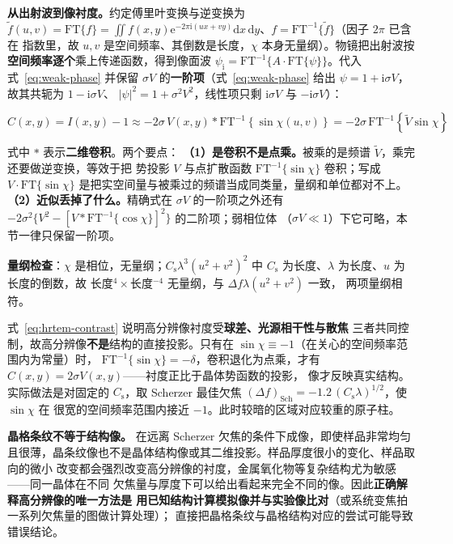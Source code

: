 \textbf{从出射波到像衬度。}约定傅里叶变换与逆变换为
$\tilde{f}(u,v)=\mathrm{FT}\{f\}=\iint f(x,y)\mathrm{e}^{-2\pi\mathrm{i}(ux+vy)}
\mathrm{d}x\,\mathrm{d}y$、$f=\mathrm{FT}^{-1}\{\tilde{f}\}$（因子 $2\pi$ 已含在
指数里，故 $u,v$ 是空间频率、其倒数是长度，$\chi$ 本身无量纲）。物镜把出射波按
\textbf{空间频率逐个}乘上传递函数，得到像面波
$\psi_{\mathrm{i}}=\mathrm{FT}^{-1}\{A\cdot\mathrm{FT}\{\psi\}\}$。代入
式~\eqref{eq:weak-phase} 并保留 $\sigma V$ 的\textbf{一阶项}（式~\eqref{eq:weak-phase}
给出 $\psi=1+\mathrm{i}\sigma V$，故其共轭为 $1-\mathrm{i}\sigma V$、
$|\psi|^{2}=1+\sigma^{2}V^{2}$，线性项只剩 $\mathrm{i}\sigma V$ 与 $-\mathrm{i}\sigma V$）：

\begin{equation}\label{eq:hrtem-contrast}
C(x,y)=I(x,y)-1
\approx-2\sigma\,V(x,y)\ast\mathrm{FT}^{-1}\!\left\{\sin\chi(u,v)\right\}
=-2\sigma\,\mathrm{FT}^{-1}\!\left\{\tilde{V}\sin\chi\right\}
\end{equation}

式中 $\ast$ 表示\textbf{二维卷积}。两个要点：
\textbf{（1）是卷积不是点乘。}被乘的是频谱 $\tilde{V}$，乘完还要做逆变换，等效于把
势投影 $V$ 与点扩散函数 $\mathrm{FT}^{-1}\{\sin\chi\}$ 卷积；写成
$V\cdot\mathrm{FT}\{\sin\chi\}$ 是把实空间量与被乘过的频谱当成同类量，量纲和单位都对不上。
\textbf{（2）近似丢掉了什么。}精确式在 $\sigma V$ 的一阶项之外还有
$-2\sigma^{2}\{V^{2}-[V\ast\mathrm{FT}^{-1}\{\cos\chi\}]^{2}\}$ 的二阶项；弱相位体
（$\sigma V\ll1$）下它可略，本节一律只保留一阶项。

\textbf{量纲检查}：$\chi$ 是相位，无量纲；$C_{\mathrm{s}}\lambda^{3}(u^{2}+v^{2})^{2}$
中 $C_{\mathrm{s}}$ 为长度、$\lambda$ 为长度、$u$ 为长度的倒数，故
长度$^{4}\times$长度$^{-4}$ 无量纲，与 $\Delta f\lambda(u^{2}+v^{2})$ 一致，
两项量纲相符。

\begin{keycond}
式~\eqref{eq:hrtem-contrast} 说明高分辨像衬度受\textbf{球差、光源相干性与散焦}
三者共同控制，故高分辨像\textbf{不是}结构的直接投影。只有在
$\sin\chi\equiv-1$（在关心的空间频率范围内为常量）时，
$\mathrm{FT}^{-1}\{\sin\chi\}=-\delta$，卷积退化为点乘，才有
$C(x,y)=2\sigma V(x,y)$——衬度正比于晶体势函数的投影，
像才反映真实结构。实际做法是对固定的 $C_{\mathrm{s}}$，取 Scherzer 最佳欠焦
$(\Delta f)_{\mathrm{Sch}}=-1.2\,(C_{\mathrm{s}}\lambda)^{1/2}$，使 $\sin\chi$ 在
很宽的空间频率范围内接近 $-1$。此时较暗的区域对应较重的原子柱。
\end{keycond}

\begin{pitfall}
\textbf{晶格条纹不等于结构像。} 在远离 Scherzer 欠焦的条件下成像，即使样品非常均匀
且很薄，晶条纹像也不是晶体结构像或其二维投影。样品厚度很小的变化、样品取向的微小
改变都会强烈改变高分辨像的衬度，金属氧化物等复杂结构尤为敏感——同一晶体在不同
欠焦量与厚度下可以给出看起来完全不同的像。因此\textbf{正确解释高分辨像的唯一方法是
用已知结构计算模拟像并与实验像比对}（或系统变焦拍一系列欠焦量的图做计算处理）；
直接把晶格条纹与晶格结构对应的尝试可能导致错误结论。
\end{pitfall}


